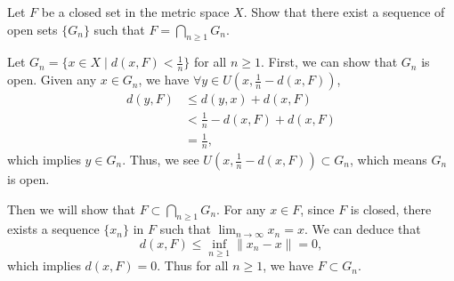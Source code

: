 \documentclass[12pt,letterpaper,boxed]{hmcpset}
\begin{document}
\begin{problem}[1.16]
	Let $F$ be a closed set in the metric space $X$. Show that there exist a sequence of open sets $\{G_n\}$ such that $F=\bigcap\limits_{n\ge 1}G_n$.
\end{problem}
\begin{solution}
	Let $G_n=\{x\in X\mid d(x,F)<\frac{1}{n}\}$ for all $n\ge 1$. First, we can show that $G_n$ is open. Given any $x\in G_n$, we have $\forall y\in U\left(x, \frac{1}{n}-d(x,F)\right)$, 
	\begin{align*}
		d(y,F)&\le d(y,x)+d(x,F)\\
		&<\frac{1}{n}-d(x,F)+d(x,F)\\
		&=\frac{1}{n},
	\end{align*} 
	which implies $y\in G_n$. Thus, we see $U\left(x, \frac{1}{n}-d(x,F)\right)\subset G_n$, which means $G_n$ is open.
	
	Then we will show that $F\subset\bigcap\limits_{n\ge 1}G_n$. For any $x\in F$, since $F$ is closed, there exists a sequence $\{x_n\}$ in $F$ such that $\lim_{n\to\infty}x_n=x$. We can deduce that 
	\[
		d(x,F)\le \inf_{n\ge1}\|x_n-x\|=0,
	\]
	which implies $d(x,F)=0$. Thus for all $n\ge 1$, we have $F\subset G_n$.
\end{solution}
\end{document}
